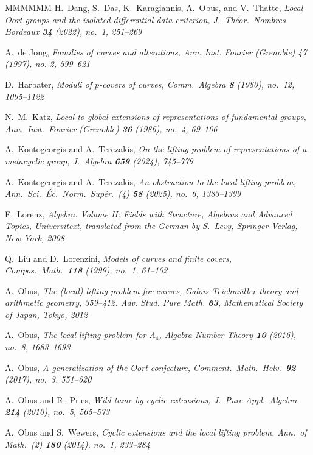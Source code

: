 \documentclass[11pt]{amsart}
\begin{document}
\begin{thebibliography}{MMMMMM}
 H.\ Dang, S.\ Das, K.\ Karagiannis, A.\ Obus, and V.\ Thatte,
\sl Local Oort groups and the isolated differential data criterion,
\rm J.\ Théor.\ Nombres Bordeaux {\bf 34} (2022), no.\ 1, 251--269

 A.\ de Jong,
\sl Families of curves and alterations,
\rm Ann. Inst. Fourier (Grenoble) 47 (1997), no. 2, 599--621

 D.\ Harbater,
\sl Moduli of $p$-covers of curves,
\rm Comm.\ Algebra {\bf 8} (1980), no.\ 12, 1095--1122

 N.\ M.\ Katz,
\sl Local-to-global extensions of representations of fundamental groups,
\rm Ann.\ Inst.\ Fourier (Grenoble) {\bf 36} (1986), no.\ 4, 69--106

 A.\ Kontogeorgis and A.\ Terezakis,
\sl On the lifting problem of representations of a metacyclic group,
\rm J.\ Algebra {\bf 659} (2024), 745--779

 A.\ Kontogeorgis and A.\ Terezakis,
\sl An obstruction to the local lifting problem,
\rm Ann.\ Sci.\ Éc.\ Norm.\ Supér.\ (4) {\bf 58} (2025), no.\ 6, 1383--1399

 F.\ Lorenz,
\sl Algebra. Volume II: Fields with Structure, Algebras and Advanced Topics,
\rm Universitext, translated from the German by S.\ Levy, Springer-Verlag, New York, 2008

 Q.\ Liu and D.\ Lorenzini,
\sl Models of curves and finite covers,
\rm Compos.\ Math.\ {\bf 118} (1999), no.\ 1, 61--102

 A.\ Obus,
\sl The (local) lifting problem for curves,
\rm Galois-Teichmüller theory and arithmetic geometry, 359–412. Adv. Stud. Pure Math. {\bf 63}, Mathematical Society of Japan, Tokyo, 2012

 A.\ Obus,
\sl The local lifting problem for $A_4$,
\rm Algebra Number Theory {\bf 10} (2016), no.\ 8, 1683--1693

 A.\ Obus,
\sl A generalization of the Oort conjecture,
\rm Comment.\ Math.\ Helv.\ {\bf 92} (2017), no.\ 3, 551--620

 A.\ Obus and R.\ Pries,
\sl Wild tame-by-cyclic extensions,
\rm J.\ Pure Appl.\ Algebra {\bf 214} (2010), no.\ 5, 565--573

 A.\ Obus and S.\ Wewers,
\sl Cyclic extensions and the local lifting problem,
\rm Ann.\ of Math.\ (2) {\bf 180} (2014), no.\ 1, 233--284


\end{thebibliography}
\end{document}
